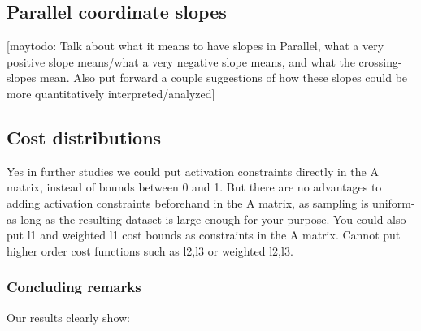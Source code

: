 \subsection{Parallel coordinate slopes} %
\label{sec:parallel_coordinate_slopes}
[maytodo: Talk about what it means to have slopes in Parallel, what a very positive slope means/what a very negative slope means, and what the crossing-slopes mean. Also put forward a couple suggestions of how these slopes could be more quantitatively interpreted/analyzed]

\subsection{Cost distributions} %
\label{sec:cost_distributions}
Yes in further studies we could put activation constraints directly in the A matrix, instead of bounds between 0 and 1. But there are no advantages to adding activation constraints beforehand in the A matrix, as sampling is uniform- as long as the resulting dataset is large enough for your purpose.
You could also put l1 and weighted l1 cost bounds as constraints in the A matrix. Cannot put higher order cost functions such as l2,l3 or weighted l2,l3.

\subsubsection{Concluding remarks} %
\label{ssub:concluding_remarks}

Our results clearly show:\\

